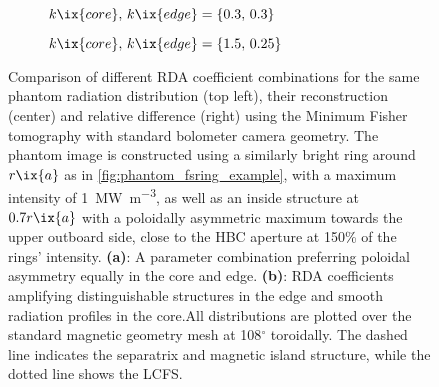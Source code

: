                 \begin{figure}[t]%
                    \centering%
                    \begin{subfigure}{\textwidth}%
                        \centering%
                        \caption{$k\ix{core},\,k\ix{edge}=\left\{0.3,\,0.3\right\}$}%
                    \end{subfigure}%
                    \newline%
                    \begin{subfigure}{\textwidth}%
                        \centering%
                        \caption{$k\ix{core},\,k\ix{edge}=\left\{1.5,\,0.25\right\}$}%
                    \end{subfigure}%
                    \caption{%
                        Comparison of different RDA coefficient combinations for the same phantom radiation distribution (top left), their reconstruction (center) and relative difference (right) using the Minimum Fisher tomography with standard bolometer camera geometry. The phantom image is constructed using a similarly bright ring around $r\ix{a}$ as in \cref{fig:phantom_fsring_example}, with a maximum intensity of \SI{1}{\mega\watt\per\cubic\meter}, as well as an inside structure at $0.7r\ix{a}$ with a poloidally asymmetric maximum towards the upper outboard side, close to the HBC aperture at 150\% of the rings' intensity. \textbf{(a)}: A parameter combination preferring poloidal asymmetry equally in the core and edge. \textbf{(b)}: RDA coefficients amplifying distinguishable structures in the edge and smooth radiation profiles in the core.All distributions are plotted over the standard magnetic geometry mesh at 108$^{\circ}$ toroidally. The dashed line indicates the separatrix and magnetic island structure, while the dotted line shows the LCFS.}\label{fig:phantom_fsring_asym_180deg_2D}%
                \end{figure}%
%
